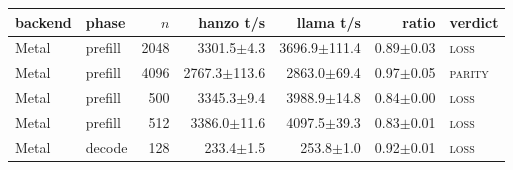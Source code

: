 \begin{tabular}{@{}llrrrrl@{}}
\toprule
backend & phase & $n$ & hanzo t/s & llama t/s & ratio & verdict \\
\midrule
Metal & prefill & 2048 & 3301.5$\pm$4.3 & 3696.9$\pm$111.4 & 0.89$\pm$0.03 & \textsc{loss} \\
Metal & prefill & 4096 & 2767.3$\pm$113.6 & 2863.0$\pm$69.4 & 0.97$\pm$0.05 & \textsc{parity} \\
Metal & prefill & 500 & 3345.3$\pm$9.4 & 3988.9$\pm$14.8 & 0.84$\pm$0.00 & \textsc{loss} \\
Metal & prefill & 512 & 3386.0$\pm$11.6 & 4097.5$\pm$39.3 & 0.83$\pm$0.01 & \textsc{loss} \\
Metal & decode & 128 & 233.4$\pm$1.5 & 253.8$\pm$1.0 & 0.92$\pm$0.01 & \textsc{loss} \\
\bottomrule
\end{tabular}
